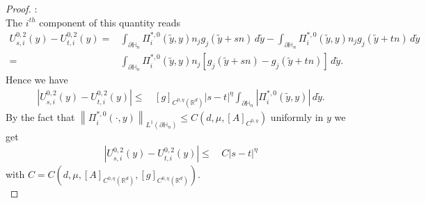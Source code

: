 \documentclass[10pt,a4paper]{amsart}
\begin{document}
\begin{proof}[Proof]
		:\\
		The $i^{th}$ component of  this quantity reads
		\begin{align*}
			U_{s,i}^{0,2}(y)- U_{t,i}^{0,2}(y)	=&  \int_{\partial\mathbb{H}_n}   \Pi_i^{*,0}(\tilde{y}, y) n_j g_j(\tilde{y}+sn)\,d\tilde{y} - \int_{\partial\mathbb{H}_n}   \Pi_i^{*,0}(\tilde{y}, y) n_j g_j(\tilde{y}+tn)\,d\tilde{y}\\
			=&\int_{\partial\mathbb{H}_n}   \Pi_i^{*,0}(\tilde{y}, y) n_j [g_j(\tilde{y}+sn)- g_j(\tilde{y}+tn)]\,d\tilde{y}.
		\end{align*}
		Hence 		we have 
		\begin{align*}
			|	U_{s,i}^{0,2}(y)- U_{t,i}^{0,2}(y)|	\leq &  \, [g]_{C^{0,\eta}(\mathbb{R}^d)}|s-t|^\eta
			\int_{\partial\mathbb{H}_n}  | \Pi_i^{*,0}(\tilde{y}, y)|\,d\tilde{y}.
		\end{align*}		
		\noindent By  the fact that
		$	\left\|\Pi^{*,0}_i\left(\cdot,y \right)\right\|_{ L^1(\partial\mathbb{H}_n)}\leq C(d, \mu, [A]_{C^{0,\eta}})
		$ uniformly in $y$
		we get
		\begin{align}
			|	U_{s,i}^{0,2}(y)- U_{t,i}^{0,2}(y)|	\leq &  \, C|s-t|^\eta	\nonumber
		\end{align}with $C=C\left(d, \mu, [A]_{C^{0,\eta}(\mathbb{R}^d)}, [g]_{C^{0,\eta}(\mathbb{R}^d) }  \right).$\\
		

\end{proof}
\end{document}

